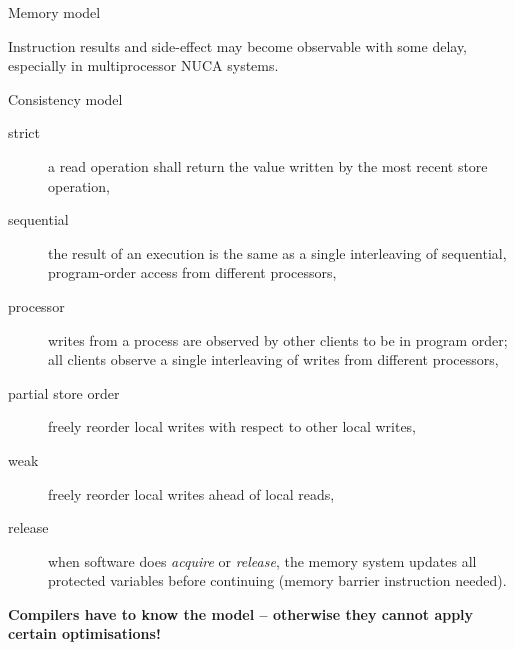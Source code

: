 \documentclass[8pt]{beamer}
\begin{document}
\begin{frame}{Memory model}
  \begin{alertblock}{}
    Instruction results and side-effect may become observable with some delay,
    especially in multiprocessor NUCA systems.
  \end{alertblock}

  \begin{block}{Consistency model}
    \begin{description}
      \item[strict] a read operation shall return the value written by the
        most recent store operation,
      \item[sequential] the result of an execution is the same as a single
        interleaving of sequential, program-order access from different
        processors,
      \item[processor] writes from a process are observed by other clients to
        be in program order; all clients observe a single interleaving of
        writes from different processors,
      \item[partial store order] freely reorder local writes with respect to
        other local writes,
      \item[weak] freely reorder local writes ahead of local reads,
      \item[release] when software does \textit{acquire} or \textit{release},
        the memory system updates all protected variables before continuing
        (memory barrier instruction needed).
    \end{description}
    \textbf{Compilers have to know the model -- otherwise they cannot apply
      certain optimisations!}
  \end{block}
\end{frame}
\end{document}

